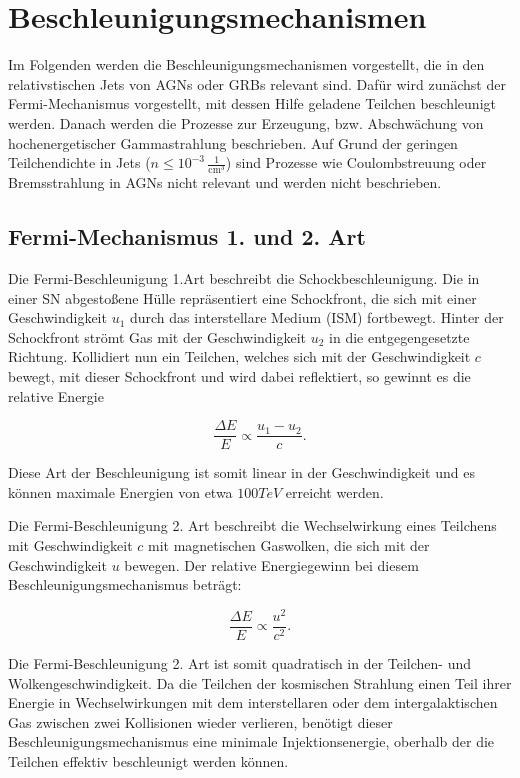 \section{Beschleunigungsmechanismen} 
\label{sec:Beschleunigungsmechanismen}
Im Folgenden werden die Beschleunigungsmechanismen vorgestellt, die in den relativstischen Jets von AGNs oder GRBs relevant sind.
Dafür wird zunächst der Fermi-Mechanismus vorgestellt, mit dessen Hilfe geladene Teilchen beschleunigt werden.
Danach werden die Prozesse zur Erzeugung, bzw. Abschwächung von hochenergetischer Gammastrahlung beschrieben.
Auf Grund der geringen Teilchendichte in Jets ($n\leq 10^{-3}\,\frac{1}{\text{cm}^3}$) sind Prozesse wie Coulombstreuung oder Bremsstrahlung in AGNs nicht relevant und werden nicht beschrieben.

\subsection{Fermi-Mechanismus 1. und 2. Art}
Die Fermi-Beschleunigung 1.Art beschreibt die Schockbeschleunigung.
Die in einer SN abgestoßene Hülle repräsentiert eine Schockfront, die sich mit einer Geschwindigkeit $u_1$ durch das interstellare Medium (ISM) fortbewegt. 
Hinter der Schockfront strömt Gas mit der Geschwindigkeit $u_2$ in die entgegengesetzte Richtung.
Kollidiert nun ein Teilchen, welches sich mit der Geschwindigkeit $c$ bewegt, mit dieser Schockfront und wird dabei reflektiert, so gewinnt es die relative Energie

\begin{equation}
 \frac{\Delta E}{E}\propto \frac{u_1-u_2}{c}.
\end{equation}

Diese Art der Beschleunigung ist somit linear in der Geschwindigkeit und es können maximale Energien von etwa $100\si{TeV}$ erreicht werden.\cite{Grupen}\cite{Longair}

Die Fermi-Beschleunigung 2. Art beschreibt die Wechselwirkung eines Teilchens mit Geschwindigkeit $c$ mit magnetischen Gaswolken, die sich mit der Geschwindigkeit $u$ bewegen.
Der relative Energiegewinn bei diesem Beschleunigungsmechanismus beträgt:

\begin{equation}
 \frac{\Delta E}{E}\propto \frac{u^2}{c^2}.
\end{equation}

Die Fermi-Beschleunigung 2. Art ist somit quadratisch in der Teilchen- und Wolkengeschwindigkeit.
Da die Teilchen der kosmischen Strahlung einen Teil ihrer Energie in Wechselwirkungen mit dem interstellaren oder dem intergalaktischen Gas zwischen zwei Kollisionen wieder verlieren, benötigt dieser Beschleunigungsmechanismus eine minimale Injektionsenergie, oberhalb der die Teilchen effektiv beschleunigt werden können.\cite{Grupen}\cite{Longair}


